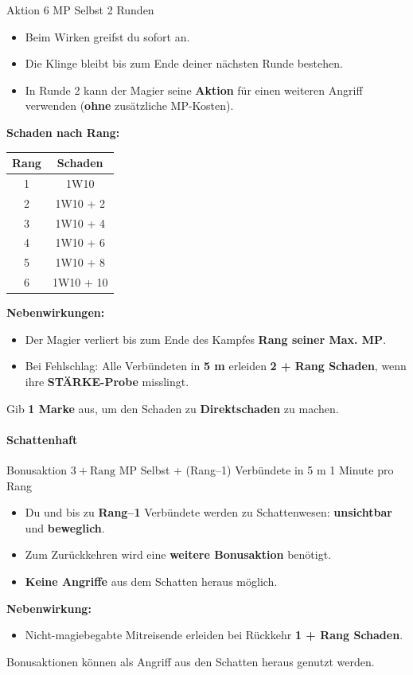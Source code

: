 \spellcard
{}
{Aktion}
{6 MP}
{Selbst}
{2 Runden}
{
	\begin{itemize}
		\item Beim Wirken greifst du sofort an.
		\item Die Klinge bleibt bis zum Ende deiner nächsten Runde bestehen.
		\item In Runde 2 kann der Magier seine \textbf{Aktion} für einen weiteren Angriff verwenden
		(\textbf{ohne} zusätzliche MP-Kosten).
	\end{itemize}
	
	\medskip
	\textbf{Schaden nach Rang:}
	\begin{center}
		\begin{tabular}{cc}
			\toprule
			\textbf{Rang} & \textbf{Schaden} \\
			\midrule
			1 & 1W10 \\
			2 & 1W10 + 2 \\
			3 & 1W10 + 4 \\
			4 & 1W10 + 6 \\
			5 & 1W10 + 8 \\
			6 & 1W10 + 10 \\
			\bottomrule
		\end{tabular}
	\end{center}
	
	\textbf{Nebenwirkungen:}
	\begin{itemize}
		\item Der Magier verliert bis zum Ende des Kampfes \textbf{Rang seiner Max. MP}.
		\item Bei Fehlschlag: Alle Verbündeten in \textbf{5 m} erleiden \textbf{2 + Rang Schaden},
		wenn ihre \textbf{STÄRKE-Probe} misslingt.
	\end{itemize}
}
{
	Gib \textbf{1 Marke} aus, um den Schaden zu \textbf{Direktschaden} zu machen.
}

\paragraph*{Schattenhaft}

\spellcard
{}
{Bonusaktion}
{$3 + \text{Rang}$ MP}
{Selbst + (Rang--1) Verbündete in 5 m}
{1 Minute pro Rang}
{
	\begin{itemize}
		\item Du und bis zu \textbf{Rang--1} Verbündete werden zu Schattenwesen:
		\textbf{unsichtbar} und \textbf{beweglich}.
		\item Zum Zurückkehren wird eine \textbf{weitere Bonusaktion} benötigt.
		\item \textbf{Keine Angriffe} aus dem Schatten heraus möglich.
	\end{itemize}
	
	\medskip
	\textbf{Nebenwirkung:}
	\begin{itemize}
		\item Nicht-magiebegabte Mitreisende erleiden bei Rückkehr \textbf{1 + Rang Schaden}.
	\end{itemize}
}
{
	Bonusaktionen können als Angriff aus den Schatten heraus genutzt werden.
}


